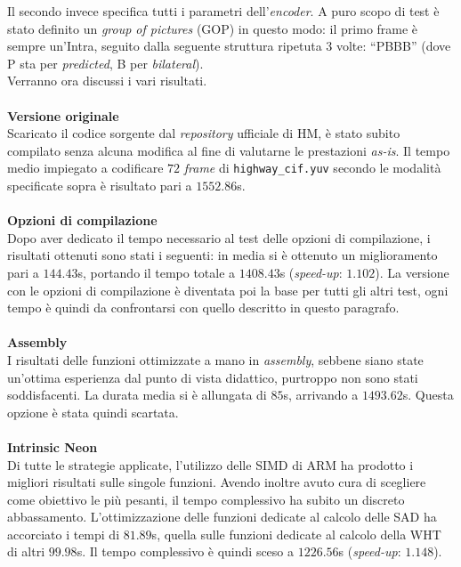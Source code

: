 Il secondo invece specifica tutti i parametri dell'\emph{encoder}. A puro 
scopo di test è stato definito un \textit{group of pictures} (GOP) in questo 
modo: il primo frame è sempre un'Intra, seguito dalla seguente struttura 
ripetuta 3 volte: ``PBBB'' (dove P sta per \textit{predicted}, B per 
\textit{bilateral}). \\
Verranno ora discussi i vari risultati. 
\\ \\
\textbf{Versione originale}\\
  Scaricato il codice sorgente dal \emph{repository} ufficiale di HM, è stato 
  subito compilato senza alcuna modifica al fine di valutarne le prestazioni 
  \emph{as-is}. Il tempo medio impiegato a codificare $72$ \emph{frame} di 
  \verb|highway_cif.yuv| secondo le modalità specificate sopra è risultato pari 
  a $1552.86$s.
\\ \\
\textbf{Opzioni di compilazione}\\
  Dopo aver dedicato il tempo necessario al test delle opzioni di compilazione, 
  i risultati ottenuti sono stati i seguenti: in media si è ottenuto un 
  miglioramento pari a $144.43$s, portando il tempo totale a $1408.43$s 
  (\textit{speed-up}: $1.102$).
  La versione con le opzioni di compilazione è diventata poi la base per tutti 
  gli altri test, ogni tempo è quindi da confrontarsi con quello descritto in 
  questo paragrafo.
\\ \\
\textbf{Assembly}\\
  I risultati delle funzioni ottimizzate a mano in \emph{assembly}, sebbene 
  siano state un'ottima esperienza dal punto di vista didattico, purtroppo non 
  sono stati soddisfacenti. 
  La durata media si è allungata di $85$s, arrivando a $1493.62$s. Questa 
  opzione è stata quindi scartata.
\\ \\
\textbf{Intrinsic Neon}\\
  Di tutte le strategie applicate, l'utilizzo delle SIMD di ARM ha prodotto i 
  migliori risultati sulle singole funzioni. Avendo inoltre avuto cura di 
  scegliere come obiettivo le più pesanti, il tempo complessivo ha subito un 
  discreto abbassamento.
  L'ottimizzazione delle funzioni dedicate al calcolo delle SAD ha accorciato i 
  tempi di $81.89$s, quella sulle funzioni dedicate al calcolo della WHT di 
  altri $99.98$s. Il tempo complessivo è quindi sceso a $1226.56$s   
  (\textit{speed-up}: $1.148$).
\\ \\
